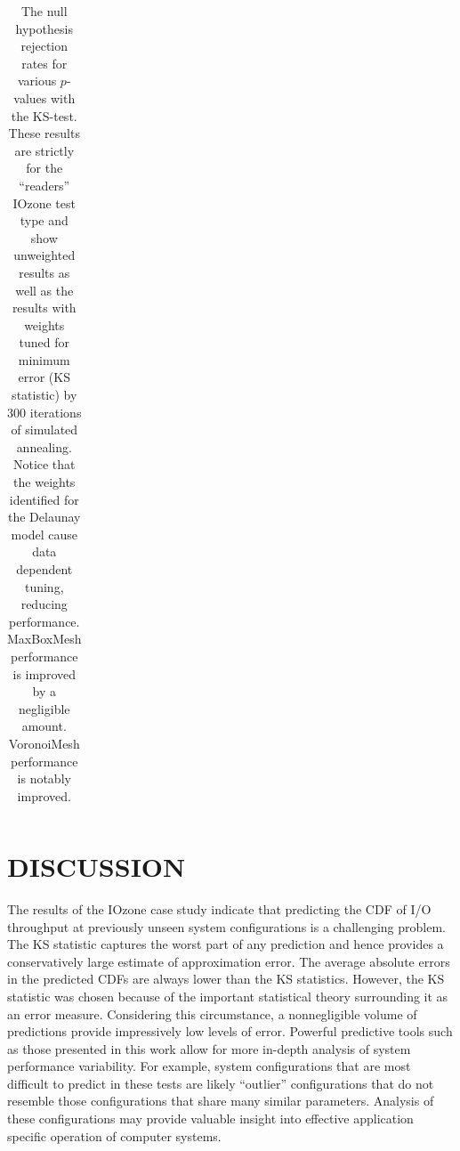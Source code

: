 \documentclass[smallextended]{svjour3}       %
\begin{document}
\begin{table}
\begin{tabular}{c|c|c|c}
    \hline
  \end{tabular}
  \caption{The null hypothesis rejection rates for various $p$-values with the KS-test. These results are strictly for the ``readers'' IOzone test type and show unweighted results as well as the results with weights tuned for minimum error (KS statistic) by 300 iterations of simulated annealing. Notice that the weights identified for the Delaunay model cause data dependent tuning, reducing performance. MaxBoxMesh performance is improved by a negligible amount. VoronoiMesh performance is notably improved.
    \vspace{-.5cm}}
  \label{tab:optimized_p_value_failure_rate}
\end{table}


\section{DISCUSSION}
\label{sec:discussion}

The results of the IOzone case study indicate that predicting the CDF of I/O throughput at previously unseen system configurations is a challenging problem. The KS statistic captures the worst part of any prediction and hence provides a conservatively large estimate of approximation error. The average absolute errors in the predicted CDFs are always lower than the KS statistics. However, the KS statistic was chosen because of the important statistical theory surrounding it as an error measure. Considering this circumstance, a nonnegligible volume of predictions provide impressively low levels of error. Powerful predictive tools such as those presented in this work allow for more in-depth analysis of system performance variability. For example, system configurations that are most difficult to predict in these tests are likely ``outlier'' configurations that do not resemble those configurations that share many similar parameters. Analysis of these configurations may provide valuable insight into effective application specific operation of computer systems.
\end{document}
